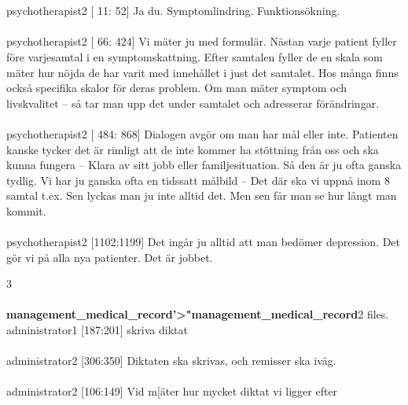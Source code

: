 \documentclass[12pt,a4paper,oneside]{article}
\begin{document}
\\\ \\
 psychotherapist2 [  11:  52] 
Ja du. Symptomlindring. Funktions{\"o}kning.  %
\\\ \\
 psychotherapist2 [  66: 424] 
Vi m{\"a}ter ju med formul{\"a}r. N{\"a}stan varje patient fyller f{\"o}re varjesamtal i en symptomskattning. Efter samtalen fyller de en skala som m{\"a}ter hur n{\"o}jda de har varit med inneh{\aa}llet i just det samtalet. Hos m{\aa}nga finns ocks{\aa} specifika skalor f{\"o}r deras problem. Om man m{\"a}ter symptom och livskvalitet -- s{\aa} tar man upp det under samtalet och adresserar f{\"o}r{\"a}ndringar. %
\\\ \\
 psychotherapist2 [ 484: 868] 
Dialogen avg{\"o}r om man har m{\aa}l eller inte. Patienten kanske tycker det {\"a}r rimligt att de inte kommer ha st{\"o}ttning fr{\aa}n oss och ska kunna fungera -- Klara av sitt jobb eller familjesituation. S{\aa} den {\"a}r ju ofta ganska tydlig. Vi har ju ganska ofta en tidssatt m{\aa}lbild -- Det d{\"a}r ska vi uppn{\aa} inom 8 samtal t.ex. Sen lyckas man ju inte alltid det. Men sen f{\aa}r man se hur l{\aa}ngt man kommit. %
\\\ \\
 psychotherapist2 [1102:1199] 
Det ing{\aa}r ju alltid att man bed{\"o}mer depression. Det g{\"o}r vi p{\aa} alla nya patienter. Det {\"a}r jobbet.  %

3 \\\ \\{\bf management\_medical\_record'>"management\_medical\_record}2 files.
 administrator1 [187:201] 
 skriva diktat %
\\\ \\
 administrator2 [306:350] 
Diktaten ska skrivas, och remisser ska iv{\"a}g. %
\\\ \\
 administrator2 [106:149] 
Vid m[{\"a}ter hur mycket diktat vi ligger efter %
\end{document}
